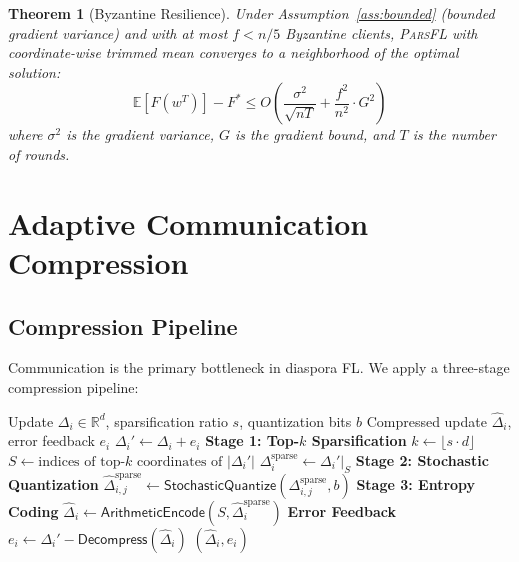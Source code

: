 \documentclass[11pt,a4paper]{article}
\newcommand{\parsfl}{\textsc{ParsFL}\xspace}
\newcommand{\RR}{\mathbb{R}}
\newcommand{\EE}{\mathbb{E}}
\newtheorem{theorem}{Theorem}
\begin{document}
\begin{theorem}[Byzantine Resilience]
Under Assumption~\ref{ass:bounded} (bounded gradient variance) and with at most $f < n/5$ Byzantine clients, \parsfl with coordinate-wise trimmed mean converges to a neighborhood of the optimal solution:
\begin{equation}
    \EE[F(w^T)] - F^* \leq O\left(\frac{\sigma^2}{\sqrt{nT}} + \frac{f^2}{n^2} \cdot G^2\right)
\end{equation}
where $\sigma^2$ is the gradient variance, $G$ is the gradient bound, and $T$ is the number of rounds.
\end{theorem}

\section{Adaptive Communication Compression}

\subsection{Compression Pipeline}

Communication is the primary bottleneck in diaspora FL. We apply a three-stage compression pipeline:

\begin{algorithm}[H]
\caption{Adaptive Compression}
\label{alg:compress}
\begin{algorithmic}[1]
\Require Update $\Delta_i \in \RR^d$, sparsification ratio $s$, quantization bits $b$
\Ensure Compressed update $\hat{\Delta}_i$, error feedback $e_i$
\State $\Delta_i' \leftarrow \Delta_i + e_i$ 
\Statex \textbf{Stage 1: Top-$k$ Sparsification}
\State $k \leftarrow \lfloor s \cdot d \rfloor$
\State $S \leftarrow \text{indices of top-}k \text{ coordinates of } |\Delta_i'|$
\State $\Delta_i^{\text{sparse}} \leftarrow \Delta_i'|_S$ 
\Statex \textbf{Stage 2: Stochastic Quantization}
    \State $\hat{\Delta}_{i,j}^{\text{sparse}} \leftarrow \mathsf{StochasticQuantize}(\Delta_{i,j}^{\text{sparse}}, b)$
\EndFor
\Statex \textbf{Stage 3: Entropy Coding}
\State $\hat{\Delta}_i \leftarrow \mathsf{ArithmeticEncode}(S, \hat{\Delta}_i^{\text{sparse}})$
\Statex \textbf{Error Feedback}
\State $e_i \leftarrow \Delta_i' - \mathsf{Decompress}(\hat{\Delta}_i)$
\State \Return $(\hat{\Delta}_i, e_i)$
\end{algorithmic}
\end{algorithm}
\end{document}
